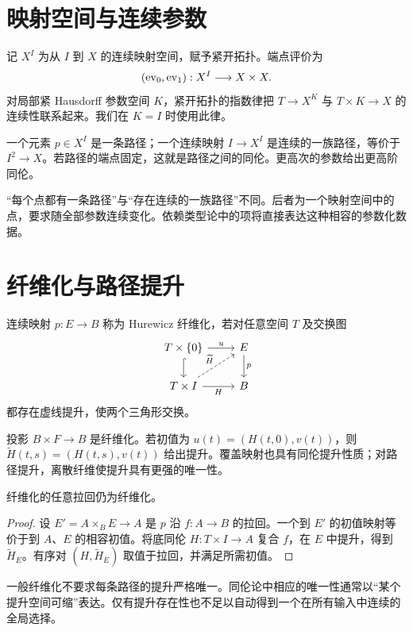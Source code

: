 \section{映射空间与连续参数}
\begin{definition}[路径空间]
记 $X^I$ 为从 $I$ 到 $X$ 的连续映射空间，赋予紧开拓扑。端点评价为
\[
(\operatorname{ev}_0,\operatorname{ev}_1):X^I\longrightarrow X\times X.
\]
对局部紧 Hausdorff 参数空间 $K$，紧开拓扑的指数律把 $T\to X^K$ 与 $T\times K\to X$ 的连续性联系起来。我们在 $K=I$ 时使用此律。
\end{definition}
\begin{example}
一个元素 $p\in X^I$ 是一条路径；一个连续映射 $I\to X^I$ 是连续的一族路径，等价于 $I^2\to X$。若路径的端点固定，这就是路径之间的同伦。更高次的参数给出更高阶同伦。
\end{example}
\begin{remark}
“每个点都有一条路径”与“存在连续的一族路径”不同。后者为一个映射空间中的点，要求随全部参数连续变化。依赖类型论中的项将直接表达这种相容的参数化数据。
\end{remark}

\section{纤维化与路径提升}
\begin{definition}
连续映射 $p:E\to B$ 称为 Hurewicz 纤维化，若对任意空间 $T$ 及交换图
\[
\begin{tikzcd}
T\times\{0\}\ar[r,"u"]\ar[d,hook]&E\ar[d,"p"]\\
T\times I\ar[r,"H"']\ar[ur,dashed,"\widetilde H"]&B
\end{tikzcd}
\]
都存在虚线提升，使两个三角形交换。
\end{definition}
\begin{example}
投影 $B\times F\to B$ 是纤维化。若初值为 $u(t)=(H(t,0),v(t))$，则 $\widetilde H(t,s)=(H(t,s),v(t))$ 给出提升。覆盖映射也具有同伦提升性质；对路径提升，离散纤维使提升具有更强的唯一性。
\end{example}
\begin{proposition}[拉回稳定性]
纤维化的任意拉回仍为纤维化。
\end{proposition}
\begin{proof}
设 $E'=A\times_BE\to A$ 是 $p$ 沿 $f:A\to B$ 的拉回。一个到 $E'$ 的初值映射等价于到 $A$、$E$ 的相容初值。将底同伦 $H:T\times I\to A$ 复合 $f$，在 $E$ 中提升，得到 $\widetilde H_E$。有序对 $(H,\widetilde H_E)$ 取值于拉回，并满足所需初值。
\end{proof}
\begin{remark}
一般纤维化不要求每条路径的提升严格唯一。同伦论中相应的唯一性通常以“某个提升空间可缩”表达。仅有提升存在性也不足以自动得到一个在所有输入中连续的全局选择。
\end{remark}

